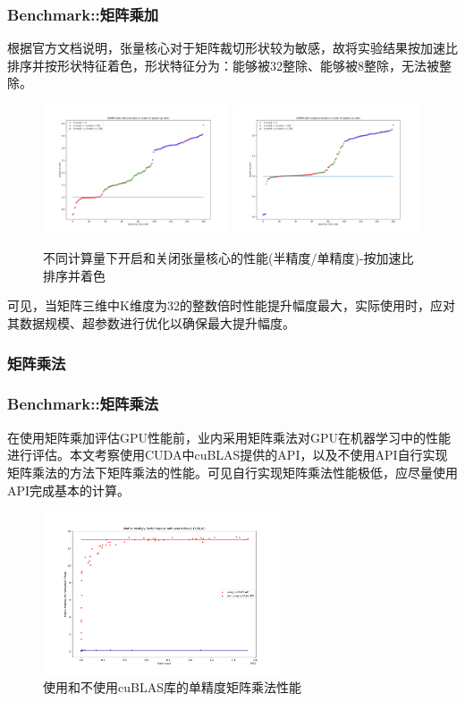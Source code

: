 \documentclass[10pt,aspectratio=169,mathserif]{beamer}
\begin{document}
	\begin{frame}
		\frametitle{Benchmark::矩阵乘加}
		根据官方文档说明，张量核心对于矩阵裁切形状较为敏感，故将实验结果按加速比排序并按形状特征着色，形状特征分为：能够被32整除、能够被8整除，无法被整除。
		\begin{figure}
			\centering
			\includegraphics[width=5.5cm]{figures/GEMM-Half-TF-Byratio-Tri.jpg}
			\includegraphics[width=5.5cm]{figures/GEMM-Single-TF-Byratio-Tri.jpg}
			\caption{不同计算量下开启和关闭张量核心的性能(半精度/单精度)-按加速比排序并着色}\label{Fig.GEMMRATIO}
		\end{figure}
		可见，当矩阵三维中K维度为32的整数倍时性能提升幅度最大，实际使用时，应对其数据规模、超参数进行优化以确保最大提升幅度。
	\end{frame}

	\subsubsection{矩阵乘法}
	\begin{frame}
		\frametitle{Benchmark::矩阵乘法}
		在使用矩阵乘加评估GPU性能前，业内采用矩阵乘法对GPU在机器学习中的性能进行评估。本文考察使用CUDA中cuBLAS提供的API，以及不使用API自行实现矩阵乘法的方法下矩阵乘法的性能。可见自行实现矩阵乘法性能极低，应尽量使用API完成基本的计算。
		\begin{figure}
			\centering
			\includegraphics[width=7cm]{figures/CUBLASPerf.jpg}
			\caption{使用和不使用cuBLAS库的单精度矩阵乘法性能}\label{Fig.MM}
		\end{figure}
		
	\end{frame}
\end{document}
